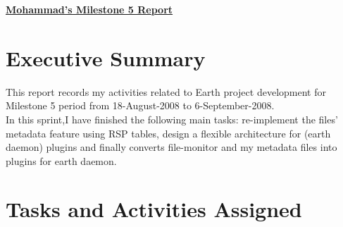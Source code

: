 
\begin{center}
{\large\textbf{\underline{{Mohammad's Milestone 5 Report}}}}
\end{center}

\section*{Executive Summary}
This report records my activities related to Earth project development for Milestone 5 period from 18-August-2008 to 6-September-2008.\\
In this sprint,I have finished the following main tasks: re-implement the files' metadata feature using RSP tables, design a flexible architecture for (earth daemon) plugins and finally converts file-monitor and my metadata files into plugins for earth daemon.     

\section*{Tasks and Activities Assigned}

